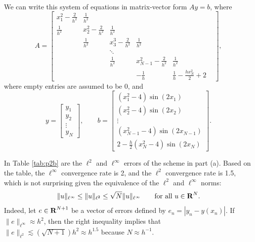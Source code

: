 \documentclass{homework}
\begin{document}
\begin{alphaparts}
\begin{align*}
		\end{align*}
		We can write this system of equations in matrix-vector form $Ay = b$, where
		\begin{equation*}
			A = \left[\begin{matrix}
				x_1^2-\frac{2}{h^2} & \frac{1}{h^2} &  &  & & \\
				\frac{1}{h^2} & x_2^2 - \frac{2}{h^2} & \frac{1}{h^2} &  &  & \\
				 & \frac{1}{h^2} & x_3^3 - \frac{2}{h^2} & \frac{1}{h^2} & &\\
			     & & \ddots &  & \\
				 &  & \frac{1}{h^2} & x_{N-1}^2 - \frac{2}{h^2} & \frac{1}{h^2} \\
				 &  &  & -\frac{1}{h} & \frac{1}{h} - \frac{hx_N^2}{2} +2
			\end{matrix}\right],
		\end{equation*}
		where empty entries are assumed to be 0, and
		\begin{equation*}
			y = \left[\begin{matrix}y_1 \\ y_2 \\ \vdots \\ y_N\end{matrix}\right], \qquad b = \left[\begin{matrix}(x_1^2 - 4)\sin(2x_1) \\[0.3em] (x_2^2-4)\sin(2x_2) \\ \vdots \\ (x_{N-1}^2-4)\sin(2x_{N-1}) \\[0.3em] 2 - \frac{h}{2}(x_N^2 - 4)\sin(2x_N)\end{matrix}\right].
		\end{equation*}
		
		\questionpart In Table \ref{tab:p2b} are the $\ell^2$ and $\ell^\infty$ errors of the scheme in part (a). Based on the table, the $\ell^\infty$ convergence rate is 2, and the $\ell^2$ convergence rate is 1.5, which is not surprising given the equivalence of the $\ell^2$ and $\ell^\infty$ norms:
		\begin{equation*}
			\lVert u \rVert_{\ell^\infty} \le \lVert u \rVert_{\ell^2} \le \sqrt{N}\lVert u \rVert_{\ell^\infty} \qquad \text{for all $u \in \textnormal{\bf R}^N$.}
		\end{equation*}
		Indeed, let $e \in \textnormal{\bf R}^{N+1}$ be a vector of errors defined by $e_n = |y_n - y(x_n)|$. If $\lVert e\rVert_{\ell^\infty} \approx h^2$, then the right inequality implies that $\lVert e \rVert_{\ell^2} \lesssim \left(\sqrt{N+1}\right)h^2 \approx h^{1.5}$ because $N \approx h^{-1}$.
		

\end{alphaparts}
\end{document}
